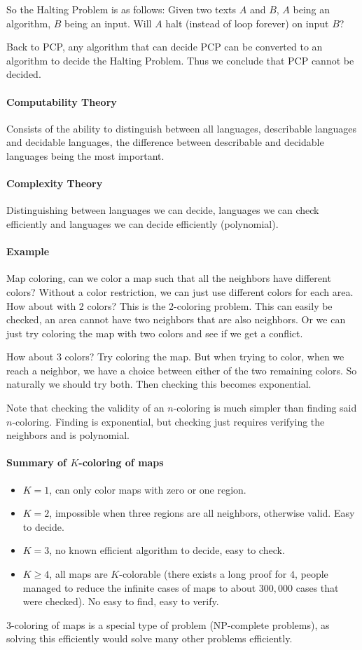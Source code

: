 \documentclass[12 pt]{article}
\begin{document}
So the Halting Problem is as follows: Given two texts $A$ and $B$, $A$
being an algorithm, $B$ being an input. Will $A$ halt (instead of loop
forever) on input $B$?

Back to PCP, any algorithm that can decide PCP can be converted to an
algorithm to decide the Halting Problem. Thus we conclude that PCP
cannot be decided.

\paragraph{Computability Theory}
Consists of the ability to distinguish between all languages,
describable languages and decidable languages, the difference between
describable and decidable languages being the most important.
\paragraph{Complexity Theory} Distinguishing between languages we can
decide, languages we can check efficiently and languages we can decide
efficiently (polynomial).
\paragraph{Example} Map coloring, can we color a map such that all the
neighbors have different colors? Without a color restriction, we can
just use different colors for each area. How about with 2 colors? This
is the 2-coloring problem. This can easily be checked, an area cannot
have two neighbors that are also neighbors. Or we can just try
coloring the map with two colors and see if we get a conflict.

How about 3 colors? Try coloring the map. But when trying to color,
when we reach a neighbor, we have a choice between either of the two
remaining colors. So naturally we should try both. Then checking this
becomes exponential.

Note that checking the validity of an $n$-coloring is much simpler
than finding said $n$-coloring. Finding is exponential, but checking
just requires verifying the neighbors and is polynomial.

\paragraph{Summary of $K$-coloring of maps}
\begin{itemize}
\item $K = 1$, can only color maps with zero or one region.
\item $K = 2$, impossible when three regions are all neighbors,
  otherwise valid. Easy to decide.
\item $K = 3$, no known efficient algorithm to decide, easy to check.
\item $K \geq 4$, all maps are $K$-colorable (there exists a long
  proof for $4$, people managed to reduce the infinite cases of maps
  to about $300,000$ cases that were checked). No easy to find, easy
  to verify.
\end{itemize}
$3$-coloring of maps is a special type of problem (NP-complete
problems), as solving this efficiently would solve many other problems
efficiently.
\end{document}
